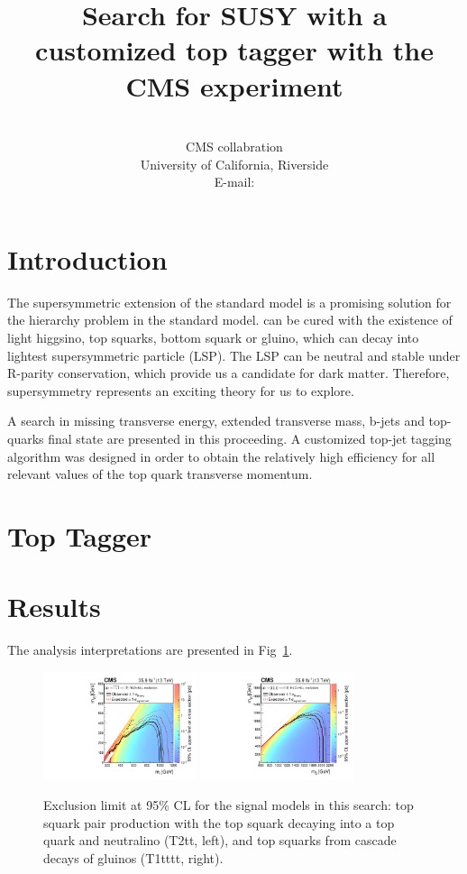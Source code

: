 \documentclass{PoS}
\title{Search for SUSY with a customized top tagger with the CMS experiment}
\author
{
  \speaker{Hua Wei}\\
  CMS collabration\\
  University of California, Riverside\\
  E-mail: \email{hua.wei@cern.ch}
}
\begin{document}
\section{Introduction}

The supersymmetric extension of the standard model is a promising solution for the hierarchy problem in the standard model. can be cured with the existence of light higgsino, top squarks, bottom squark or gluino, which can decay into lightest supersymmetric particle (LSP). The LSP can be neutral and stable under R-parity conservation, which provide us a candidate for dark matter. Therefore, supersymmetry represents an exciting theory for us to explore.

A search in missing transverse energy, extended transverse mass, b-jets and top-quarks final state are presented in this proceeding. A customized top-jet tagging algorithm was designed in order to obtain the relatively high efficiency for all relevant values of the top quark transverse momentum.

\section{Top Tagger}
\section{Results}

The analysis interpretations are presented in Fig~\ref{fig:signal_results}. 

\begin{figure}[ht!]
 \begin{centering}
  \includegraphics[width=0.40\textwidth]{figures/Covered_T2tt_OnlyXSEC.pdf}
  \includegraphics[width=0.40\textwidth]{figures/T1tttt_OnlyXSEC.pdf}
  \caption{Exclusion limit at 95\% CL for the signal models in this search: top squark pair production with the top squark decaying into a top quark and neutralino (T2tt, left), and top squarks from cascade decays of gluinos (T1tttt, right).}
  \label{fig:signal_results}
 \end{centering}
\end{figure}
\end{document}
